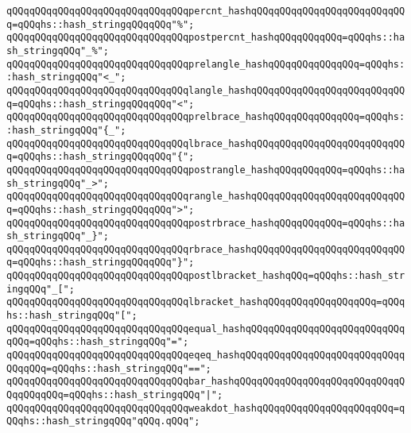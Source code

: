 \verb|qQQqqQQqqQQqqQQqqQQqqQQqqQQqqQQqpercnt_hashqQQqqQQqqQQqqQQqqQQqqQQqqQQq=qQQqhs::hash_stringqQQqqQQq"%";|\newline
\verb|qQQqqQQqqQQqqQQqqQQqqQQqqQQqqQQqpostpercnt_hashqQQqqQQqqQQq=qQQqhs::hash_stringqQQq"_%";|\newline
\newline
\verb|qQQqqQQqqQQqqQQqqQQqqQQqqQQqqQQqprelangle_hashqQQqqQQqqQQqqQQq=qQQqhs::hash_stringqQQq"<_";|\newline
\verb|qQQqqQQqqQQqqQQqqQQqqQQqqQQqqQQqlangle_hashqQQqqQQqqQQqqQQqqQQqqQQqqQQq=qQQqhs::hash_stringqQQqqQQq"<";|\newline
\newline
\verb|qQQqqQQqqQQqqQQqqQQqqQQqqQQqqQQqprelbrace_hashqQQqqQQqqQQqqQQq=qQQqhs::hash_stringqQQq"{_";|\newline
\verb|qQQqqQQqqQQqqQQqqQQqqQQqqQQqqQQqlbrace_hashqQQqqQQqqQQqqQQqqQQqqQQqqQQq=qQQqhs::hash_stringqQQqqQQq"{";|\newline
\newline
\verb|qQQqqQQqqQQqqQQqqQQqqQQqqQQqqQQqpostrangle_hashqQQqqQQqqQQq=qQQqhs::hash_stringqQQq"_>";|\newline
\verb|qQQqqQQqqQQqqQQqqQQqqQQqqQQqqQQqrangle_hashqQQqqQQqqQQqqQQqqQQqqQQqqQQq=qQQqhs::hash_stringqQQqqQQq">";|\newline
\newline
\verb|qQQqqQQqqQQqqQQqqQQqqQQqqQQqqQQqpostrbrace_hashqQQqqQQqqQQq=qQQqhs::hash_stringqQQq"_}";|\newline
\verb|qQQqqQQqqQQqqQQqqQQqqQQqqQQqqQQqrbrace_hashqQQqqQQqqQQqqQQqqQQqqQQqqQQq=qQQqhs::hash_stringqQQqqQQq"}";|\newline
\newline
\verb|qQQqqQQqqQQqqQQqqQQqqQQqqQQqqQQqpostlbracket_hashqQQq=qQQqhs::hash_stringqQQq"_[";|\newline
\verb|qQQqqQQqqQQqqQQqqQQqqQQqqQQqqQQqlbracket_hashqQQqqQQqqQQqqQQqqQQq=qQQqhs::hash_stringqQQq"[";|\newline
\newline
\verb|qQQqqQQqqQQqqQQqqQQqqQQqqQQqqQQqequal_hashqQQqqQQqqQQqqQQqqQQqqQQqqQQqqQQq=qQQqhs::hash_stringqQQq"=";|\newline
\verb|qQQqqQQqqQQqqQQqqQQqqQQqqQQqqQQqeqeq_hashqQQqqQQqqQQqqQQqqQQqqQQqqQQqqQQqqQQq=qQQqhs::hash_stringqQQq"==";|\newline
\verb|qQQqqQQqqQQqqQQqqQQqqQQqqQQqqQQqbar_hashqQQqqQQqqQQqqQQqqQQqqQQqqQQqqQQqqQQqqQQq=qQQqhs::hash_stringqQQq"|\verb#|";#\newline
\verb|qQQqqQQqqQQqqQQqqQQqqQQqqQQqqQQqweakdot_hashqQQqqQQqqQQqqQQqqQQqqQQq=qQQqhs::hash_stringqQQq"qQQq.qQQq";|\newline
